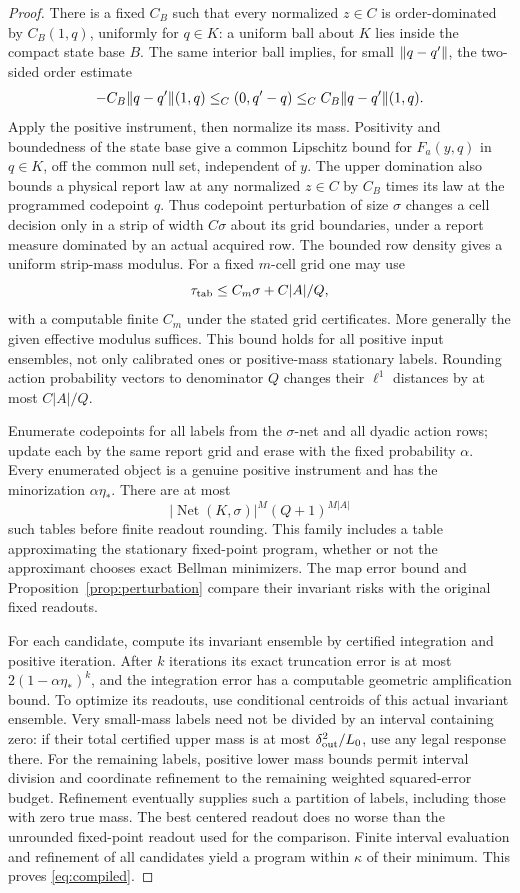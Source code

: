 \begin{proof}
There is a fixed $C_B$ such that every normalized $z\in C$ is order-dominated by $C_B(1,q)$, uniformly for $q\in K$: a uniform ball about $K$ lies inside the compact state base $B$. The same interior ball implies, for small $\lVert q-q'\rVert$, the two-sided order estimate
\[
 -C_B\lVert q-q'\rVert(1,q)\le_C (0,q'-q)
       \le_C C_B\lVert q-q'\rVert(1,q).
\]
Apply the positive instrument, then normalize its mass. Positivity and boundedness of the state base give a common Lipschitz bound for $F_a(y,q)$ in $q\in K$, off the common null set, independent of $y$. The upper domination also bounds a physical report law at any normalized $z\in C$ by $C_B$ times its law at the programmed codepoint $q$. Thus codepoint perturbation of size $\sigma$ changes a cell decision only in a strip of width $C\sigma$ about its grid boundaries, under a report measure dominated by an actual acquired row. The bounded row density gives a uniform strip-mass modulus. For a fixed $m$-cell grid one may use
\[
 \tau_{\rm tab}\le C_m\sigma+C|A|/Q,
\]
with a computable finite $C_m$ under the stated grid certificates. More generally the given effective modulus suffices. This bound holds for all positive input ensembles, not only calibrated ones or positive-mass stationary labels. Rounding action probability vectors to denominator $Q$ changes their $\ell^1$ distances by at most $C|A|/Q$.

Enumerate codepoints for all labels from the $\sigma$-net and all dyadic action rows; update each by the same report grid and erase with the fixed probability $\alpha$. Every enumerated object is a genuine positive instrument and has the minorization $\alpha\eta_*$. There are at most
\[
 |\operatorname{Net}(K,\sigma)|^M (Q+1)^{M|A|}
\]
such tables before finite readout rounding. This family includes a table approximating the stationary fixed-point program, whether or not the approximant chooses exact Bellman minimizers. The map error bound and Proposition~\ref{prop:perturbation} compare their invariant risks with the original fixed readouts.

For each candidate, compute its invariant ensemble by certified integration and positive iteration. After $k$ iterations its exact truncation error is at most $2(1-\alpha\eta_*)^k$, and the integration error has a computable geometric amplification bound. To optimize its readouts, use conditional centroids of this actual invariant ensemble. Very small-mass labels need not be divided by an interval containing zero: if their total certified upper mass is at most $\delta_{\rm out}^2/L_0$, use any legal response there. For the remaining labels, positive lower mass bounds permit interval division and coordinate refinement to the remaining weighted squared-error budget. Refinement eventually supplies such a partition of labels, including those with zero true mass. The best centered readout does no worse than the unrounded fixed-point readout used for the comparison. Finite interval evaluation and refinement of all candidates yield a program within $\kappa$ of their minimum. This proves \eqref{eq:compiled}.


\end{proof}
